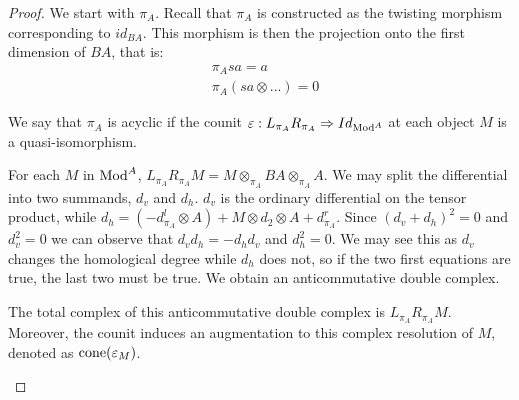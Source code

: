 \documentclass[../thesis.tex]{subfiles}
\begin{document}
            \begin{proof}
                We start with $\pi_A$. Recall that $\pi_A$ is constructed as the twisting morphism corresponding to $id_{BA}$. This morphism is then the projection onto the first dimension of $BA$, that is:
                \begin{align*}
                    & \pi_A{sa} = a \\
                    & \pi_A(sa\otimes ...) = 0
                \end{align*}

                We say that $\pi_A$ is acyclic if the counit $\varepsilon : L_{\pi_A}R_{\pi_A} \Rightarrow Id_{\tt{Mod}^A}$ at each object $M$ is a quasi-isomorphism.

                For each $M$ in $\tt{Mod}^A$, $L_{\pi_A}R_{\pi_A}M = M\otimes_{\pi_A}BA\otimes_{\pi_A}A$. We may split the differential into two summands, $d_v$ and $d_h$. $d_v$ is the ordinary differential on the tensor product, while $d_h = (-d^l_{\pi_A}\otimes A) + M\otimes d_2 \otimes A + d^r_{\pi_A}$. Since $(d_v + d_h)^2 = 0$ and $d_v^2 = 0$ we can observe that $d_vd_h = -d_hd_v$ and $d_h^2 = 0$. We may see this as $d_v$ changes the homological degree while $d_h$ does not, so if the two first equations are true, the last two must be true. We obtain an anticommutative double complex.
                \begin{center}
                \end{center}
                The total complex of this anticommutative double complex is $L_{\pi_A}R_{\pi_A}M$. Moreover, the counit induces an augmentation to this complex resolution of $M$, denoted as $\tt{cone}(\varepsilon_M)$. 
                \begin{center}
                \end{center}
                

\end{proof}
\end{document}
